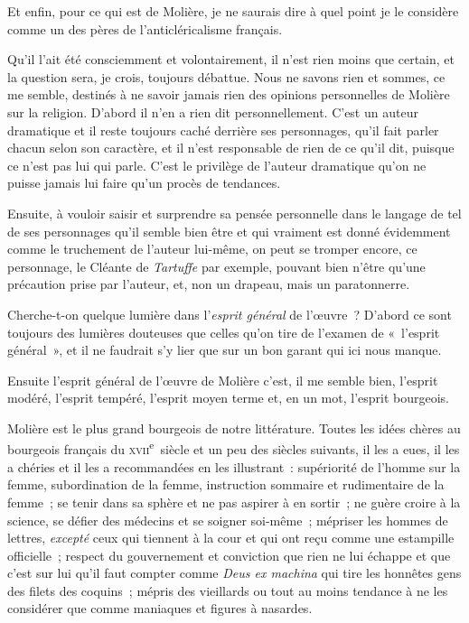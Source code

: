 \documentclass[french,twoside]{book} %
\newcommand{\astertri}{\medskip\par\centerline{\color{rubric}\large\selectfont{\syms ✻\,✻\,✻}}\medskip\par}%
\begin{document}
\astertri

\noindent Et enfin, pour ce qui est de Molière, je ne saurais dire à quel point je le considère comme un des pères de l’anticléricalisme français.\par
Qu’il l’ait été consciemment et volontairement, il n’est rien moins que certain, et la question sera, je crois, toujours débattue. Nous ne savons rien et sommes, ce me semble, destinés à ne savoir jamais rien des opinions personnelles de Molière sur la religion. D’abord il n’en a rien dit personnellement. C’est un auteur dramatique et il reste toujours caché derrière ses personnages, qu’il fait parler chacun selon son caractère, et il n’est responsable de rien de ce qu’il dit, puisque ce n’est pas lui qui parle. C’est le privilège de l’auteur dramatique qu’on ne puisse jamais lui faire qu’un procès de tendances.\par
Ensuite, à vouloir saisir et surprendre sa pensée  personnelle dans le langage de tel de ses personnages qu’il semble bien être et qui vraiment est donné évidemment comme le truchement de l’auteur lui-même, on peut se tromper encore, ce personnage, le Cléante de {\itshape Tartuffe} par exemple, pouvant bien n’être qu’une précaution prise par l’auteur, et, non un drapeau, mais un paratonnerre.\par
Cherche-t-on quelque lumière dans l’{\itshape esprit général} de l’œuvre ? D’abord ce sont toujours des lumières douteuses que celles qu’on tire de l’examen de « l’esprit général », et il ne faudrait s’y lier que sur un bon garant qui ici nous manque.\par
Ensuite l’esprit général de l’œuvre de Molière c’est, il me semble bien, l’esprit modéré, l’esprit tempéré, l’esprit moyen terme et, en un mot, l’esprit bourgeois.\par
Molière est le plus grand bourgeois de notre littérature. Toutes les idées chères au bourgeois français du \textsc{xvii}\textsuperscript{e} siècle et un peu des siècles suivants, il les a eues, il les a chéries et il les a recommandées en les illustrant : supériorité de l’homme sur la femme, subordination de la femme, instruction sommaire et rudimentaire de la femme ; se tenir dans sa sphère et ne pas aspirer à en sortir ; ne guère croire à la science, se défier des médecins  et se soigner soi-même ; mépriser les hommes de lettres, {\itshape excepté} ceux qui tiennent à la cour et qui ont reçu comme une estampille officielle ; respect du gouvernement et conviction que rien ne lui échappe et que c’est sur lui qu’il faut compter comme {\itshape Deus ex machina} qui tire les honnêtes gens des filets des coquins ; mépris des vieillards ou tout au moins tendance à ne les considérer que comme maniaques et figures à nasardes.\par
\end{document}
